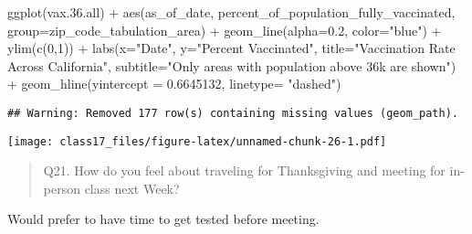 \documentclass[
]{article}
\newenvironment{Shaded}{\begin{snugshade}}{\end{snugshade}}
\newcommand{\AttributeTok}[1]{\textcolor[rgb]{0.77,0.63,0.00}{#1}}
\newcommand{\DecValTok}[1]{\textcolor[rgb]{0.00,0.00,0.81}{#1}}
\newcommand{\FloatTok}[1]{\textcolor[rgb]{0.00,0.00,0.81}{#1}}
\newcommand{\FunctionTok}[1]{\textcolor[rgb]{0.00,0.00,0.00}{#1}}
\newcommand{\NormalTok}[1]{#1}
\newcommand{\SpecialCharTok}[1]{\textcolor[rgb]{0.00,0.00,0.00}{#1}}
\newcommand{\StringTok}[1]{\textcolor[rgb]{0.31,0.60,0.02}{#1}}
\begin{document}
\begin{Shaded}
\begin{Highlighting}[]
\FunctionTok{ggplot}\NormalTok{(vax.}\FloatTok{36.}\NormalTok{all) }\SpecialCharTok{+}
  \FunctionTok{aes}\NormalTok{(as\_of\_date,}
\NormalTok{      percent\_of\_population\_fully\_vaccinated, }
      \AttributeTok{group=}\NormalTok{zip\_code\_tabulation\_area) }\SpecialCharTok{+}
  \FunctionTok{geom\_line}\NormalTok{(}\AttributeTok{alpha=}\FloatTok{0.2}\NormalTok{, }\AttributeTok{color=}\StringTok{"blue"}\NormalTok{) }\SpecialCharTok{+}
  \FunctionTok{ylim}\NormalTok{(}\FunctionTok{c}\NormalTok{(}\DecValTok{0}\NormalTok{,}\DecValTok{1}\NormalTok{)) }\SpecialCharTok{+}
  \FunctionTok{labs}\NormalTok{(}\AttributeTok{x=}\StringTok{"Date"}\NormalTok{, }\AttributeTok{y=}\StringTok{"Percent Vaccinated"}\NormalTok{,}
       \AttributeTok{title=}\StringTok{"Vaccination Rate Across California"}\NormalTok{,}
       \AttributeTok{subtitle=}\StringTok{"Only areas with population above 36k are shown"}\NormalTok{) }\SpecialCharTok{+}
  \FunctionTok{geom\_hline}\NormalTok{(}\AttributeTok{yintercept =} \FloatTok{0.6645132}\NormalTok{, }\AttributeTok{linetype=} \StringTok{"dashed"}\NormalTok{)}
\end{Highlighting}
\end{Shaded}

\begin{verbatim}
## Warning: Removed 177 row(s) containing missing values (geom_path).
\end{verbatim}

\texttt{[image: class17\_files/figure-latex/unnamed-chunk-26-1.pdf]}

\begin{quote}
Q21. How do you feel about traveling for Thanksgiving and meeting for
in-person class next Week?
\end{quote}

Would prefer to have time to get tested before meeting.
\end{document}
